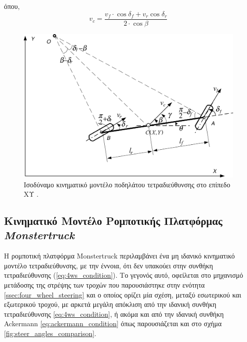 {\noindent
όπου,
\begin{equation}
	v_c = \frac{v_f \cdot \cos{\delta_f} + v_r \cos{\delta_r}}{2 \cdot \cos{\beta}}
	\label{eq:v_c_f_r}
\end{equation}

\begin{figure}[!ht]
	\centering
	\includegraphics[width=0.6\linewidth]{Chapters/Chapter2/Figures/4ws_xy_plane.png}
	\caption[Ισοδύναμο κινηματικό μοντέλο ποδηλάτου τετραδιεύθυνσης στο επίπεδο ΧΥ.]{Ισοδύναμο κινηματικό μοντέλο ποδηλάτου τετραδιεύθυνσης στο επίπεδο ΧΥ \cite{4ws_trajectory_planning}.}
	\label{fig:4ws_xy_plane}
\end{figure}

\newpage
\bigskip
\subsection{Κινηματικό Μοντέλο Ρομποτικής Πλατφόρμας \textit{Monstertruck}} \label{ssec:monstertruck_kinematics}
Η ρομποτική πλατφόρμα {Monstertruck} περιλαμβάνει ένα {μη ιδανικό κινηματικό μοντέλο τετραδιεύθυνσης}, με την έννοια, ότι δεν υπακούει στην {συνθήκη τετραδιεύθυνσης} (\ref{eq:4ws_condition}). Το γεγονός αυτό, οφείλεται στο μηχανισμό μετάδοσης της στρέψης των τροχών που παρουσιάστηκε στην ενότητα \ref{ssec:four_wheel_steering} και ο οποίος ορίζει μία σχέση, μεταξύ εσωτερικού και εξωτερικού τροχού, με αρκετά μεγάλη απόκλιση από την ιδανική συνθήκη τετραδιεύθυνσης \ref{eq:4ws_condition}, ή ακόμα και από την ιδανική συνθήκη Ackermann \ref{eq:ackermann_condition} όπως παρουσιάζεται και στο σχήμα \ref{fig:steer_angles_comparison}.

}
